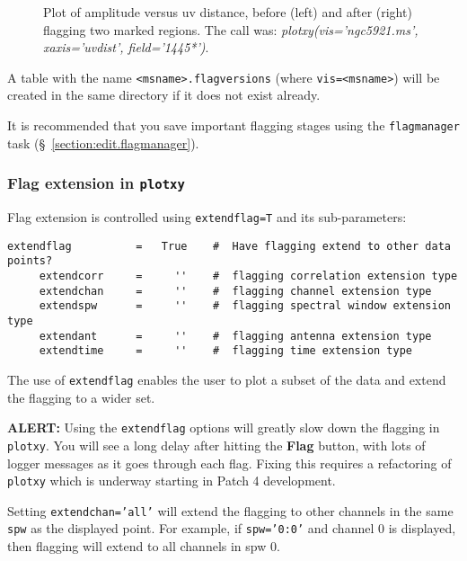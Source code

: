 \begin{figure}[h!]
\begin{center}
\caption{\label{fig:markflags.plotxy} Plot of amplitude versus
uv distance, before (left) and after (right) flagging two marked regions.
The call was:
{\it plotxy(vis='ngc5921.ms', xaxis='uvdist', field='1445*')}.
}
\hrulefill
\end{center}
\end{figure}

A table with the name {\tt <msname>.flagversions} (where
{\tt vis=<msname>}) will be created in the same directory if
it does not exist already.

It is recommended that you save important flagging stages using
the {\tt flagmanager} task (\S~\ref{section:edit.flagmanager}).

\subsubsection{Flag extension in {\tt plotxy}}
\label{section:edit.plot.plotxy.extend}

Flag extension is controlled using {\tt extendflag=T} and its sub-parameters:
\small
\begin{verbatim}
extendflag          =   True    #  Have flagging extend to other data points?
     extendcorr     =     ''    #  flagging correlation extension type
     extendchan     =     ''    #  flagging channel extension type
     extendspw      =     ''    #  flagging spectral window extension type
     extendant      =     ''    #  flagging antenna extension type
     extendtime     =     ''    #  flagging time extension type
\end{verbatim}
\normalsize
The use of {\tt extendflag} enables the user to plot a subset of the
data and extend the flagging to a wider set.

{\bf ALERT:} Using the {\tt extendflag} options will greatly
slow down the flagging in {\tt plotxy}.  You will see a long delay
after hitting the {\bf Flag} button, with lots of logger messages
as it goes through each flag.  Fixing this requires a refactoring
of {\tt plotxy} which is underway starting in Patch 4 development.

Setting {\tt extendchan='all'} will extend the flagging to other
channels in the same {\tt spw} as the displayed point.  For example,
if {\tt spw='0:0'} and channel 0 is displayed, then flagging will
extend to all channels in spw 0.

